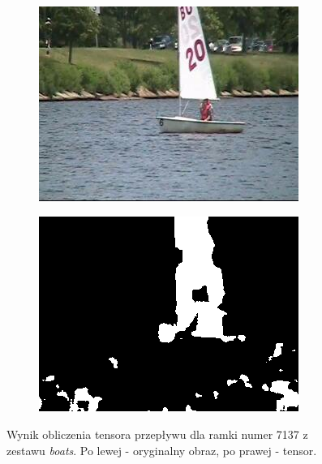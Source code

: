 \begin{figure}[!h]
\centering
\begin{subfigure}[b]{0.4\textwidth}
\includegraphics[width=\textwidth]{img/fg}
\caption{}
\end{subfigure}
\quad
\begin{subfigure}[b]{0.4\textwidth}
\includegraphics[width=\textwidth]{img/FT}
\caption{}
\end{subfigure}
\caption{Wynik obliczenia tensora przepływu dla ramki numer 7137 z zestawu \textit{boats}. Po lewej - oryginalny obraz, po prawej - tensor.\label{fig:FT}}
\end{figure}

